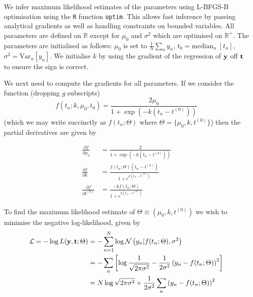 We infer maximum likelihood estimates of the parameters using L-BFGS-B optimisation \cite{byrd1995limited} using the \texttt{R} function \texttt{optim}. This allows fast inference by passing analytical gradients as well as handling constraints on bounded variables. All parameters are defined on $\mathbb{R}$ except for $\mu_0$ and $\sigma^2$ which are optimised on $\mathbb{R}^+$. The parameters are initialised as follows: $\mu_0$ is set to $\frac{1}{N} \sum_n y_n$, $t_0 = \text{median}_n \;[ t_n]$, $\sigma^2 = \text{Var}_n [y_n]$. We initialise $k$ by using the gradient of the regression of ${\bf y}$ off ${\bf t}$ to ensure the sign is correct.

We next need to compute the gradients for all parameters. If we consider the function (dropping $g$ subscripts)
\begin{equation}
	f(t_n; k, \mu_0, t_0) = \frac{2 \mu_0}{1 + \exp\left(-k(t_n - t^{(0)})\right)}
\end{equation}
(which we may write succinctly as $f(t_n; \Theta)$ where $\Theta = \{ \mu_0, k, t^{(0)} \}$) then the partial derivatives are given by

\begin{equation} \label{eq:derivatives}
\begin{aligned}
\frac{\partial f}{\partial \mu_0} & = \frac{2}{1 + \exp\left(-k(t_n - t^{(0)})\right)} \\
\frac{\partial f}{\partial k} & = \frac{ f(t_n; \Theta) (t_n - t^{(0)})}{1 + e^{k(t_n - t^{(0)})}} \\
\frac{\partial f}{\partial t^{(0)}} & = \frac{-k f(t_n; \Theta)}{1 + e^{k(t_n - t^{(0)})}}
\end{aligned}
\end{equation}

To find the maximum likelihood estimate of $\Theta \equiv (\mu_0, k, t^{(0)})$ we wish to minimise the negative log-likelihood, given by
\begin{equation}
\begin{aligned}
\mathcal{L}  = - \log L({\bf y}, {\bf t}; \Theta) & = -\sum_{n=1}^N \log \mathcal{N}\left(y_n | f(t_n; \Theta), \sigma^2 \right) \\
& = -\sum_n \left[ \log \frac{1}{\sqrt{2 \pi \sigma^2}} - \frac{1}{2 \sigma^2} \left( y_n - f(t_n; \Theta) \right)^2\right] \\
& = N \log \sqrt{2 \pi \sigma^2} + \frac{1}{2 \sigma^2} \sum_n \left( y_n - f(t_n; \Theta) \right)^2
\end{aligned}
\end{equation}


